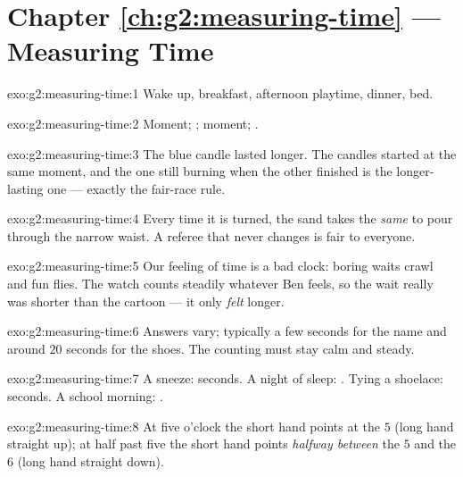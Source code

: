 \section*{Chapter \ref{ch:g2:measuring-time} --- Measuring Time}

\begin{solution}{exo:g2:measuring-time:1}
Wake up, breakfast, afternoon playtime, dinner, bed.
\end{solution}

\begin{solution}{exo:g2:measuring-time:2}
Moment; ; moment; .
\end{solution}

\begin{solution}{exo:g2:measuring-time:3}
The blue candle lasted longer. The candles started at the same
moment, and the one still burning when the other finished is the
longer-lasting one --- exactly the fair-race rule.
\end{solution}

\begin{solution}{exo:g2:measuring-time:4}
Every time it is turned, the sand takes the \emph{same}  to
pour through the narrow waist. A referee that never changes is fair
to everyone.
\end{solution}

\begin{solution}{exo:g2:measuring-time:5}
Our feeling of time is a bad clock: boring waits crawl and fun flies.
The watch counts steadily whatever Ben feels, so the wait really was
shorter than the cartoon --- it only \emph{felt} longer.
\end{solution}

\begin{solution}{exo:g2:measuring-time:6}
Answers vary; typically a few seconds for the name and around
$20$ seconds for the shoes. The counting must stay calm and steady.
\end{solution}

\begin{solution}{exo:g2:measuring-time:7}
A sneeze: seconds. A night of sleep: . Tying a shoelace:
seconds. A school morning: .
\end{solution}

\begin{solution}{exo:g2:measuring-time:8}
At five o'clock the short hand points at the $5$ (long hand straight
up); at half past five the short hand points \emph{halfway between}
the $5$ and the $6$ (long hand straight down).
\end{solution}

